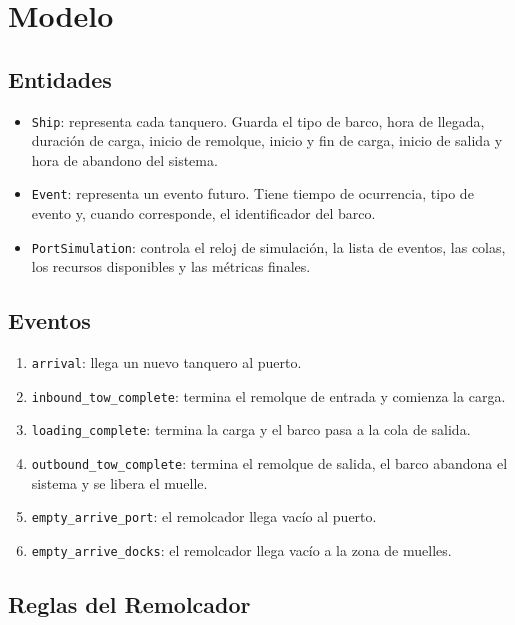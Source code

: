 \documentclass[12pt]{article}
\begin{document}
\section{Modelo}

\subsection{Entidades}

\begin{itemize}
    \item \texttt{Ship}: representa cada tanquero. Guarda el tipo de barco, hora de llegada, duración de carga, inicio de remolque, inicio y fin de carga, inicio de salida y hora de abandono del sistema.
    \item \texttt{Event}: representa un evento futuro. Tiene tiempo de ocurrencia, tipo de evento y, cuando corresponde, el identificador del barco.
    \item \texttt{PortSimulation}: controla el reloj de simulación, la lista de eventos, las colas, los recursos disponibles y las métricas finales.
\end{itemize}

\subsection{Eventos}

\begin{enumerate}
    \item \texttt{arrival}: llega un nuevo tanquero al puerto.
    \item \texttt{inbound\_tow\_complete}: termina el remolque de entrada y comienza la carga.
    \item \texttt{loading\_complete}: termina la carga y el barco pasa a la cola de salida.
    \item \texttt{outbound\_tow\_complete}: termina el remolque de salida, el barco abandona el sistema y se libera el muelle.
    \item \texttt{empty\_arrive\_port}: el remolcador llega vacío al puerto.
    \item \texttt{empty\_arrive\_docks}: el remolcador llega vacío a la zona de muelles.
\end{enumerate}

\subsection{Reglas del Remolcador}
\end{document}
